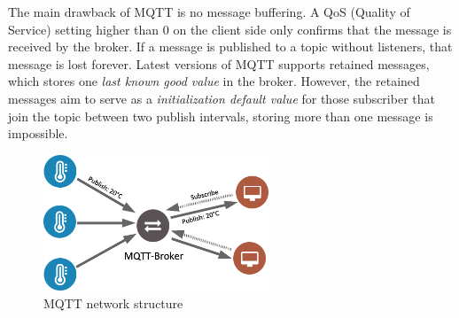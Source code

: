 The main drawback of MQTT is no message buffering. A QoS (Quality of Service) setting higher than 0 on the client side only confirms that the message is received by the broker. If a message is published to a topic without listeners, that message is lost forever. Latest versions of MQTT supports retained messages, which stores one \emph{last known good value} in the broker. However, the retained messages aim to serve as a \emph{initialization default value} for those subscriber that join the topic between two publish intervals, storing more than one message is impossible.
\begin{figure}
  \centering
  \includegraphics[width=0.6\textwidth]{figures/mqtt.png}
  \caption{MQTT network structure}\label{fig:mqtt}
\end{figure}
